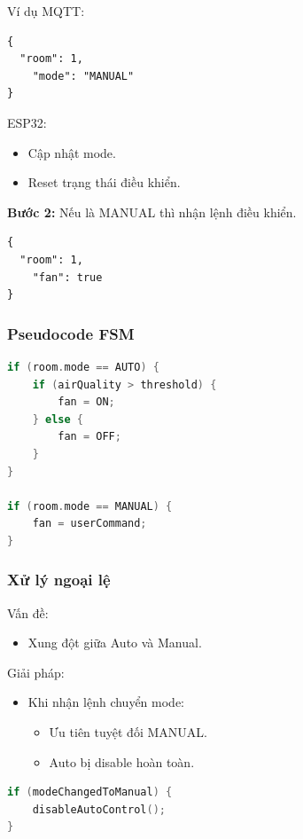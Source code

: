 \documentclass[../BTL_PTIT.tex]{subfiles}
\begin{document}
Ví dụ MQTT:
\begin{lstlisting}[language={}]
{
  "room": 1,
    "mode": "MANUAL"
}
\end{lstlisting}

ESP32:
\begin{itemize}[label=\textbullet]
    \item Cập nhật mode.
    \item Reset trạng thái điều khiển.
\end{itemize}

\textbf{Bước 2:} Nếu là MANUAL thì nhận lệnh điều khiển.

\begin{lstlisting}[language={}]
{
  "room": 1,
    "fan": true
}
\end{lstlisting}

\subsubsection{Pseudocode FSM}
\begin{lstlisting}[language=C]
if (room.mode == AUTO) {
    if (airQuality > threshold) {
        fan = ON;
    } else {
        fan = OFF;
    }
}

if (room.mode == MANUAL) {
    fan = userCommand;
}
\end{lstlisting}

\subsubsection{Xử lý ngoại lệ}
Vấn đề:
\begin{itemize}[label=\textbullet]
    \item Xung đột giữa Auto và Manual.
\end{itemize}

Giải pháp:
\begin{itemize}[label=\textbullet]
    \item Khi nhận lệnh chuyển mode:
    \begin{itemize}[label=--]
        \item Ưu tiên tuyệt đối MANUAL.
        \item Auto bị disable hoàn toàn.
    \end{itemize}
\end{itemize}

\begin{lstlisting}[language=C]
if (modeChangedToManual) {
    disableAutoControl();
}
\end{lstlisting}
\end{document}
